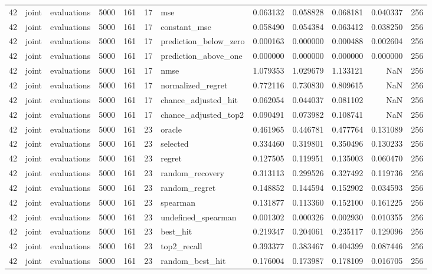 \begin{tabular}{rllrrrlrrrrr}
42 & joint & evaluations & 5000 & 161 & 17 & mse & 0.063132 & 0.058828 & 0.068181 & 0.040337 & 256 \\
42 & joint & evaluations & 5000 & 161 & 17 & constant_mse & 0.058490 & 0.054384 & 0.063412 & 0.038250 & 256 \\
42 & joint & evaluations & 5000 & 161 & 17 & prediction_below_zero & 0.000163 & 0.000000 & 0.000488 & 0.002604 & 256 \\
42 & joint & evaluations & 5000 & 161 & 17 & prediction_above_one & 0.000000 & 0.000000 & 0.000000 & 0.000000 & 256 \\
42 & joint & evaluations & 5000 & 161 & 17 & nmse & 1.079353 & 1.029679 & 1.133121 & NaN & 256 \\
42 & joint & evaluations & 5000 & 161 & 17 & normalized_regret & 0.772116 & 0.730830 & 0.809615 & NaN & 256 \\
42 & joint & evaluations & 5000 & 161 & 17 & chance_adjusted_hit & 0.062054 & 0.044037 & 0.081102 & NaN & 256 \\
42 & joint & evaluations & 5000 & 161 & 17 & chance_adjusted_top2 & 0.090491 & 0.073982 & 0.108741 & NaN & 256 \\
42 & joint & evaluations & 5000 & 161 & 23 & oracle & 0.461965 & 0.446781 & 0.477764 & 0.131089 & 256 \\
42 & joint & evaluations & 5000 & 161 & 23 & selected & 0.334460 & 0.319801 & 0.350496 & 0.130233 & 256 \\
42 & joint & evaluations & 5000 & 161 & 23 & regret & 0.127505 & 0.119951 & 0.135003 & 0.060470 & 256 \\
42 & joint & evaluations & 5000 & 161 & 23 & random_recovery & 0.313113 & 0.299526 & 0.327492 & 0.119736 & 256 \\
42 & joint & evaluations & 5000 & 161 & 23 & random_regret & 0.148852 & 0.144594 & 0.152902 & 0.034593 & 256 \\
42 & joint & evaluations & 5000 & 161 & 23 & spearman & 0.131877 & 0.113360 & 0.152100 & 0.161225 & 256 \\
42 & joint & evaluations & 5000 & 161 & 23 & undefined_spearman & 0.001302 & 0.000326 & 0.002930 & 0.010355 & 256 \\
42 & joint & evaluations & 5000 & 161 & 23 & best_hit & 0.219347 & 0.204061 & 0.235117 & 0.129096 & 256 \\
42 & joint & evaluations & 5000 & 161 & 23 & top2_recall & 0.393377 & 0.383467 & 0.404399 & 0.087446 & 256 \\
42 & joint & evaluations & 5000 & 161 & 23 & random_best_hit & 0.176004 & 0.173987 & 0.178109 & 0.016705 & 256 \\

\end{tabular}
